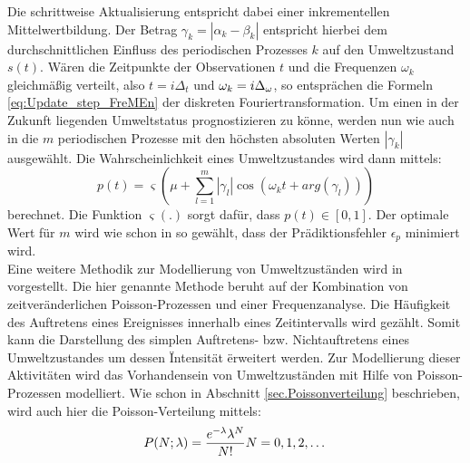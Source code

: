 Die schrittweise Aktualisierung entspricht dabei einer inkrementellen Mittelwertbildung. Der Betrag $\gamma_k = |\alpha_k - \beta_k|$ entspricht hierbei dem durchschnittlichen Einfluss des periodischen Prozesses $k$ auf den Umweltzustand $s(t)$.
Wären die Zeitpunkte der Observationen $t$ und die Frequenzen $\omega_k$ gleichmäßig verteilt, also $t=i\Delta_t$ und $\omega_k = i\Delta_{\mathrm{\omega}}$, so entsprächen die Formeln \ref{eq:Update_step_FreMEn} der diskreten Fouriertransformation.
Um einen in der Zukunft liegenden Umweltstatus prognostizieren zu könne, werden nun wie auch in \cite{Krajnik.2014} die $m$ periodischen Prozesse mit den höchsten absoluten Werten $|\gamma_k|$ ausgewählt. Die Wahrscheinlichkeit eines Umweltzustandes wird dann mittels:
\begin{equation}
	p(t) = \varsigma(\mu + \sum_{l=1}^{m} |\gamma_l|\cos(\omega_k t + arg(\gamma_l)))
	\label{eq:State_probability}
\end{equation}
berechnet. Die Funktion $\varsigma(.)$ sorgt dafür, dass $p(t) \in [0,1]$. Der optimale Wert für $m$ wird wie schon in \cite{Krajnik.2014} so gewählt, dass der Prädiktionsfehler $\epsilon_p$ minimiert wird. \\
Eine weitere Methodik zur Modellierung von Umweltzuständen wird in \cite{Jovan.2016} vorgestellt. Die hier genannte Methode beruht auf der Kombination von zeitveränderlichen Poisson-Prozessen und einer Frequenzanalyse. Die Häufigkeit des Auftretens eines Ereignisses innerhalb eines Zeitintervalls wird gezählt. Somit kann die Darstellung des simplen Auftretens- bzw. Nichtauftretens eines Umweltzustandes \cite{Krajnik.2014} um dessen \" Intensität \" erweitert werden. Zur Modellierung dieser Aktivitäten wird das Vorhandensein von Umweltzuständen mit Hilfe von Poisson-Prozessen modelliert. Wie schon  in Abschnitt \ref{sec.Poissonverteilung} beschrieben, wird auch hier die Poisson-Verteilung mittels:
\begin{equation}
	P(N;\lambda) = \frac{e^{\mathrm{-\lambda}} \lambda^N}{N!}	N=0,1,2,\dots
\end{equation}

